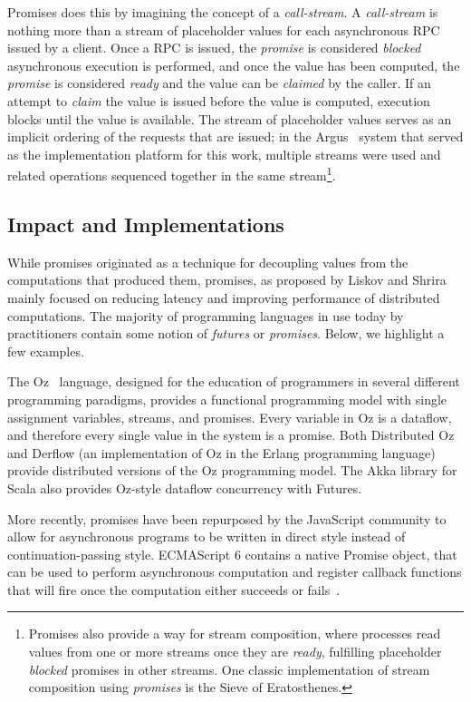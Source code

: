 Promises does this by imagining the concept of a \textit{call-stream}.  A \textit{call-stream} is nothing more than a stream of placeholder values for each asynchronous RPC issued by a client.  Once a RPC is issued, the \textit{promise} is considered \textit{blocked} asynchronous execution is performed, and once the value has been computed, the \textit{promise} is considered \textit{ready} and the value can be \textit{claimed} by the caller.  If an attempt to \textit{claim} the value is issued before the value is computed, execution blocks until the value is available.  The stream of placeholder values serves as an implicit ordering of the requests that are issued; in the Argus~\cite{liskov1988distributed} system that served as the implementation platform for this work, multiple streams were used and related operations sequenced together in the same stream\footnote{Promises also provide a way for stream composition, where processes read values from one or more streams once they are \textit{ready}, fulfilling placeholder \textit{blocked} promises in other streams.  One classic implementation of stream composition using \textit{promises} is the Sieve of Eratosthenes.}.

\subsection{Impact and Implementations}

While promises originated as a technique for decoupling values from the computations that produced them, promises, as proposed by Liskov and Shrira mainly focused on reducing latency and improving performance of distributed computations.  The majority of programming languages in use today by practitioners contain some notion of \textit{futures} or \textit{promises}.  Below, we highlight a few examples.

The Oz~\cite{henz1993oz} language, designed for the education of programmers in several different programming paradigms, provides a functional programming model with single assignment variables, streams, and promises.  Every variable in Oz is a dataflow, and therefore every single value in the system is a promise.  Both Distributed Oz~\cite{haridi1997overview} and Derflow (an implementation of Oz in the Erlang programming language)~\cite{Bravo:2014:DDD:2633448.2633451} provide distributed versions of the Oz programming model.  The Akka library for Scala also provides Oz-style dataflow concurrency with Futures.

More recently, promises have been repurposed by the JavaScript community to allow for asynchronous programs to be written in direct style instead of continuation-passing style.  ECMAScript 6 contains a native Promise object, that can be used to perform asynchronous computation and register callback functions that will fire once the computation either succeeds or fails~\cite{wiki:futures}.
